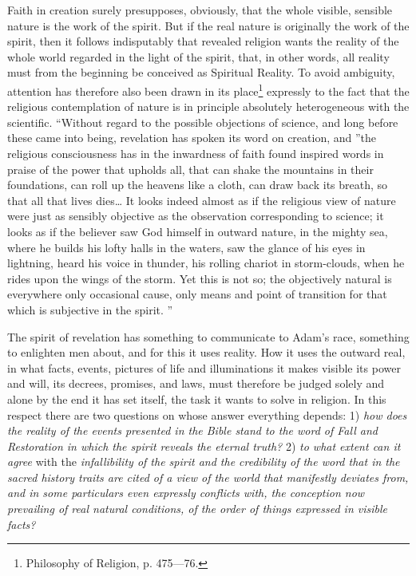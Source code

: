 \documentclass[12pt,a4paper,openany]{book}
\newcommand{\opage}[1]{\marginnote{\footnotesize\textit{[#1]}}}
\begin{document}
Faith in creation surely presupposes, obviously, that
the whole visible, sensible nature is the work of the spirit.
But if the real nature is originally the work of the spirit,
then it follows indisputably that revealed
religion wants the reality of the whole world regarded
in the light of the spirit, that, in other words, all reality must
from the beginning be conceived as Spiritual Reality. To
avoid ambiguity, attention has therefore also been drawn in its place\footnote[1]{Philosophy of Religion, p. 475---76.}
expressly to the fact that the religious contemplation of nature
is in principle absolutely heterogeneous with the
scientific. ``Without regard to the possible objections of
science, and long before these came into being, revelation
has spoken its word on creation, and ''the religious
consciousness has in the inwardness of faith found inspired
words in praise of the power that upholds all, that
can shake the mountains in their foundations, can roll up the heavens
like a cloth, can draw back its breath, so
\setcounter{footnote}{0}%
\opage{299}that all that lives dies\dots{} It looks indeed almost as if
the religious view of nature were just as sensibly objective
as the observation corresponding to science; it looks
as if the believer saw God himself in outward nature,
in the mighty sea, where he builds his lofty halls in the waters,
saw the glance of his eyes in lightning, heard his voice
in thunder, his rolling chariot in storm-clouds, when
he rides upon the wings of the storm. Yet this is not so;
the objectively natural is everywhere only occasional cause,
only means and point of transition for that which is
subjective in the spirit. ''

The spirit of revelation has something to communicate to Adam's
race, something to enlighten men about, and for this it
uses reality. How it uses the
outward real, in what facts, events,
pictures of life and illuminations it makes visible its
power and will, its decrees, promises, and laws,
must therefore be judged solely and alone by the end it has
set itself, the task it wants to solve in religion. In
this respect there are two questions on whose answer
everything depends: 1) \emph{how does the reality
of the events presented in the Bible
stand to the word of Fall and Restoration
in which the spirit reveals the eternal truth?}
2) \emph{to what extent can it agree} with the \emph{infallibility of the spirit
and the credibility of the word that in the
sacred history traits are cited of a view of the world
that manifestly deviates from, and in some
particulars even expressly conflicts with,
the conception now prevailing of real
\setcounter{footnote}{0}%
\opage{300}natural conditions, of the order of things
expressed in visible facts?}
\end{document}
